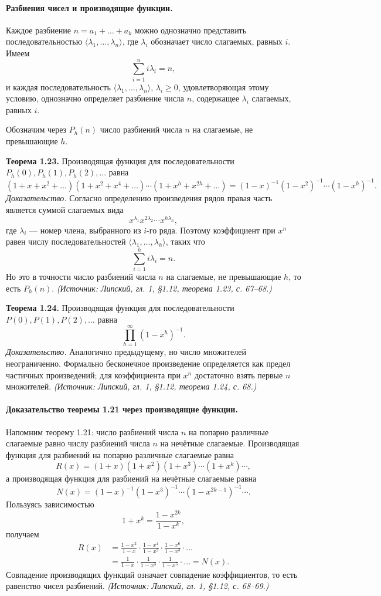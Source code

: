 \documentclass[a4paper,12pt]{article}
\begin{document}
\paragraph{Разбиения чисел и производящие функции.}
Каждое разбиение \(n=a_1+\dots+a_k\) можно однозначно представить последовательностью \(\langle\lambda_1,\dots,\lambda_n\rangle\), где \(\lambda_i\) обозначает число слагаемых, равных \(i\). Имеем
\[
\sum_{i=1}^{n}i\lambda_i=n,
\]
и каждая последовательность \(\langle\lambda_1,\dots,\lambda_n\rangle\), \(\lambda_i\ge0\), удовлетворяющая этому условию, однозначно определяет разбиение числа \(n\), содержащее \(\lambda_i\) слагаемых, равных \(i\).

Обозначим через \(P_h(n)\) число разбиений числа \(n\) на слагаемые, не превышающие \(h\).

\textbf{Теорема 1.23.} Производящая функция для последовательности \(P_h(0),P_h(1),P_h(2),\dots\) равна
\[
(1+x+x^2+\dots)(1+x^2+x^4+\dots)\cdots(1+x^h+x^{2h}+\dots)
=(1-x)^{-1}(1-x^2)^{-1}\cdots(1-x^h)^{-1}.
\]
\emph{Доказательство.} Согласно определению произведения рядов правая часть является суммой слагаемых вида
\[
x^{\lambda_1}x^{2\lambda_2}\cdots x^{h\lambda_h},
\]
где \(\lambda_i\) --- номер члена, выбранного из \(i\)-го ряда. Поэтому коэффициент при \(x^n\) равен числу последовательностей \(\langle\lambda_1,\dots,\lambda_h\rangle\), таких что
\[
\sum_{i=1}^{h}i\lambda_i=n.
\]
Но это в точности число разбиений числа \(n\) на слагаемые, не превышающие \(h\), то есть \(P_h(n)\).
\textit{(Источник: Липский, гл. 1, §1.12, теорема 1.23, с. 67--68.)}

\textbf{Теорема 1.24.} Производящая функция для последовательности \(P(0),P(1),P(2),\dots\) равна
\[
\prod_{h=1}^{\infty}(1-x^h)^{-1}.
\]
\emph{Доказательство.} Аналогично предыдущему, но число множителей неограниченно. Формально бесконечное произведение определяется как предел частичных произведений; для коэффициента при \(x^n\) достаточно взять первые \(n\) множителей.
\textit{(Источник: Липский, гл. 1, §1.12, теорема 1.24, с. 68.)}

\paragraph{Доказательство теоремы 1.21 через производящие функции.}
Напомним теорему 1.21: число разбиений числа \(n\) на попарно различные слагаемые равно числу разбиений числа \(n\) на нечётные слагаемые. Производящая функция для разбиений на попарно различные слагаемые равна
\[
R(x)=(1+x)(1+x^2)(1+x^3)\cdots(1+x^k)\cdots,
\]
а производящая функция для разбиений на нечётные слагаемые равна
\[
N(x)=(1-x)^{-1}(1-x^3)^{-1}\cdots(1-x^{2k-1})^{-1}\cdots.
\]
Пользуясь зависимостью
\[
1+x^k=\frac{1-x^{2k}}{1-x^k},
\]
получаем
\[
\begin{aligned}
R(x)&=\frac{1-x^2}{1-x}\cdot\frac{1-x^4}{1-x^2}\cdot\frac{1-x^6}{1-x^3}\cdot\dots\\
&=\frac{1}{1-x}\cdot\frac{1}{1-x^3}\cdot\frac{1}{1-x^5}\cdot\dots=N(x).
\end{aligned}
\]
Совпадение производящих функций означает совпадение коэффициентов, то есть равенство чисел разбиений.
\textit{(Источник: Липский, гл. 1, §1.12, с. 68--69.)}
\end{document}

